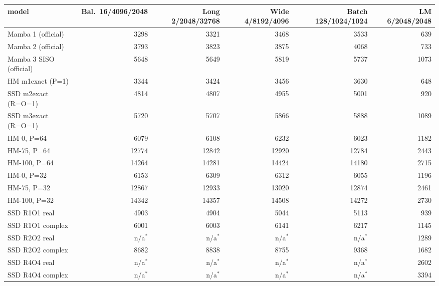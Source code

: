 \begin{tabular}{l r r r r r }
\toprule
model & Bal.\ 16/4096/2048 & Long 2/2048/32768 & Wide 4/8192/4096 & Batch 128/1024/1024 & LM 6/2048/2048 \\
\midrule
Mamba 1 (official) & 3298 & 3321 & 3468 & 3533 & 639 \\
Mamba 2 (official) & 3793 & 3823 & 3875 & 4068 & 733 \\
Mamba 3 SISO (official) & 5648 & 5649 & 5819 & 5737 & 1073 \\
HM m1exact (P=1) & 3344 & 3424 & 3456 & 3630 & 648 \\
SSD m2exact (R=O=1) & 4814 & 4807 & 4955 & 5001 & 920 \\
SSD m3exact (R=O=1) & 5720 & 5707 & 5866 & 5888 & 1089 \\
HM-0, P=64 & 6079 & 6108 & 6232 & 6023 & 1182 \\
HM-75, P=64 & 12774 & 12842 & 12920 & 12784 & 2443 \\
HM-100, P=64 & 14264 & 14281 & 14424 & 14180 & 2715 \\
HM-0, P=32 & 6153 & 6309 & 6312 & 6055 & 1196 \\
HM-75, P=32 & 12867 & 12933 & 13020 & 12874 & 2461 \\
HM-100, P=32 & 14342 & 14357 & 14508 & 14272 & 2730 \\
SSD R1O1 real & 4903 & 4904 & 5044 & 5113 & 939 \\
SSD R1O1 complex & 6001 & 6003 & 6141 & 6217 & 1145 \\
SSD R2O2 real & n/a$^\ast$ & n/a$^\ast$ & n/a$^\ast$ & n/a$^\ast$ & 1289 \\
SSD R2O2 complex & 8682 & 8838 & 8755 & 9368 & 1682 \\
SSD R4O4 real & n/a$^\ast$ & n/a$^\ast$ & n/a$^\ast$ & n/a$^\ast$ & 2602 \\
SSD R4O4 complex & n/a$^\ast$ & n/a$^\ast$ & n/a$^\ast$ & n/a$^\ast$ & 3394 \\
\bottomrule
\end{tabular}
